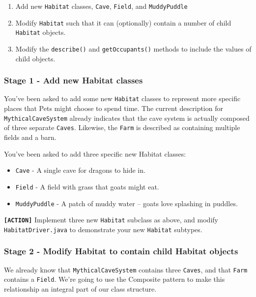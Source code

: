 \documentclass[
]{book}
\providecommand{\tightlist}{%
  \setlength{\itemsep}{0pt}\setlength{\parskip}{0pt}}
\begin{document}
\begin{enumerate}
\def\labelenumi{\arabic{enumi}.}
\tightlist
\item
  Add new \texttt{Habitat} classes, \texttt{Cave}, \texttt{Field}, and \texttt{MuddyPuddle}
\item
  Modify \texttt{Habitat} such that it can (optionally) contain a number of child \texttt{Habitat} objects.
\item
  Modify the \texttt{describe()} and \texttt{getOccupants()} methods to include the values of child objects.
\end{enumerate}

\hypertarget{habitats}{%
\subsubsection{Stage 1 - Add new Habitat classes}\label{habitats}}

You've been asked to add some new \texttt{Habitat} classes to represent more specific places that Pets might choose to spend time.
The current description for \texttt{MythicalCaveSystem} already indicates that the cave system is actually composed of three separate \texttt{Caves}.
Likewise, the \texttt{Farm} is described as containing multiple fields and a barn.

You've been asked to add three specific new Habitat classes:

\begin{itemize}
\tightlist
\item
  \texttt{Cave} - A single cave for dragons to hide in.
\item
  \texttt{Field} - A field with grass that goats might eat.
\item
  \texttt{MuddyPuddle} - A patch of muddy water -- goats love splashing in puddles.
\end{itemize}

\textbf{\texttt{{[}ACTION{]}}} Implement three new \texttt{Habitat} subclass as above, and modify \texttt{HabitatDriver.java} to demonstrate your new \texttt{Habitat} subtypes.

\hypertarget{children}{%
\subsubsection{Stage 2 - Modify Habitat to contain child Habitat objects}\label{children}}

We already know that \texttt{MythicalCaveSystem} contains three \texttt{Caves}, and that \texttt{Farm} contains a \texttt{Field}. We're going to use the Composite pattern to make this relationship an integral part of our class structure.
\end{document}
